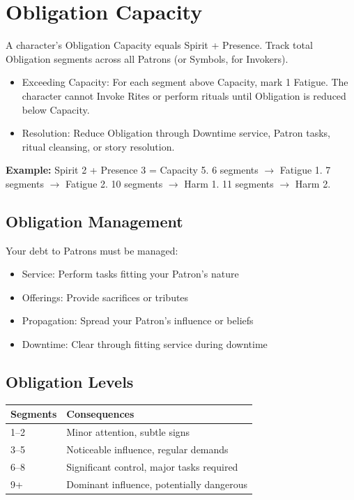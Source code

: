 \documentclass[11pt,twoside,openany]{book}
\begin{document}
\section*{Obligation Capacity} 

A character's Obligation Capacity equals Spirit + Presence. Track total Obligation segments across all Patrons (or Symbols, for Invokers).

\begin{itemize}
\item Exceeding Capacity: For each segment above Capacity, mark 1 Fatigue. The character cannot Invoke Rites or perform rituals until Obligation is reduced below Capacity.
\item Resolution: Reduce Obligation through Downtime service, Patron tasks, ritual cleansing, or story resolution.
\end{itemize}

\textbf{Example:} Spirit 2 + Presence 3 = Capacity 5. 6 segments $\rightarrow$ Fatigue 1. 7 segments $\rightarrow$ Fatigue 2. 10 segments $\rightarrow$ Harm 1. 11 segments $\rightarrow$ Harm 2.

\subsection*{Obligation Management}

Your debt to Patrons must be managed:
\begin{itemize}
\item Service: Perform tasks fitting your Patron's nature
\item Offerings: Provide sacrifices or tributes
\item Propagation: Spread your Patron's influence or beliefs
\item Downtime: Clear through fitting service during downtime
\end{itemize}

\subsection*{Obligation Levels}

\begin{center}
\begin{tabular}{|l|l|}
\hline
\textbf{Segments} & \textbf{Consequences} \\
\hline
1--2 & Minor attention, subtle signs \\
3--5 & Noticeable influence, regular demands \\
6--8 & Significant control, major tasks required \\
9+ & Dominant influence, potentially dangerous \\
\hline
\end{tabular}
\end{center}
\end{document}
